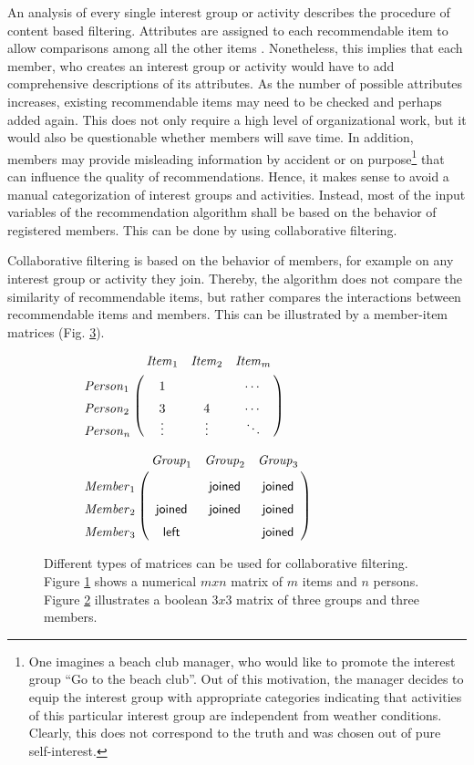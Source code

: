 \documentclass[12pt,numbers=noenddot,parskip,bibliography=totocnumbered,listof=totocnumbered,draft]{scrreprt}
\begin{document}
An analysis of every single interest group or activity describes the procedure of content based filtering. Attributes are assigned to each recommendable item to allow comparisons among all the other items \citep[p.42]{klahold2009}. Nonetheless, this implies that each member, who creates an interest group or activity would have to add comprehensive descriptions of its attributes. As the number of possible attributes increases, existing recommendable items may need to be checked and perhaps added again. This does not only require a high level of organizational work, but it would also be questionable whether members will save time. In addition, members may provide misleading information by accident or on purpose\footnote{One imagines a beach club manager, who would like to promote the interest group ``Go to the beach club''. Out of this motivation, the manager decides to equip the interest group with appropriate categories indicating that activities of this particular interest group are independent from weather conditions. Clearly, this does not correspond to the truth and was chosen out of pure self-interest.} that can influence the quality of recommendations. Hence, it makes sense to avoid a manual categorization of interest groups and activities. Instead, most of the input variables of the recommendation algorithm shall be based on the behavior of registered members.  This can be done by using collaborative filtering.

Collaborative filtering is based on the behavior of members, for example on any interest group or activity they join. \citep[p.62]{klahold2009} Thereby, the algorithm does not compare the similarity of recommendable items, but rather compares the interactions between recommendable items and members. This can be illustrated by a member-item matrices (Fig. \ref{matrix}).

\begin{figure}
\begin{subfigure}[t]{0.5\textwidth}%
\centering
$\bordermatrix{~ & \mathit{Item}_1 & \mathit{Item}_2 & \mathit{Item}_m \cr
\vphantom{\vdots}\mathit{Person}_1 & 1 &  & \cdots  \cr
\vphantom{\vdots}\mathit{Person}_2 & 3 & 4 & \cdots \cr
\vphantom{\vdots}\mathit{Person}_n & \vdotswithin{3} & \vdotswithin{4} & \ddots  }$
\caption{}
\label{nummatrix}
\end{subfigure}%
\begin{subfigure}[t]{0.5\textwidth}%
\centering
$\bordermatrix{~ & \mathit{Group}_1 & \mathit{Group}_2 & \mathit{Group}_3 \cr
\vphantom{\vdots}\mathit{Member}_1 &  & \mathsf{joined} & \mathsf{joined} \cr
\vphantom{\vdots}\mathit{Member}_2 & \mathsf{joined} & \mathsf{joined} & \mathsf{joined} \cr
\vphantom{\vdots}\mathit{Member}_3 & \mathsf{left} &  & \mathsf{joined} }$
\caption{}
\label{boolmatrix}
\end{subfigure}%
\caption[Member-item matrices for collaborative filtering]{Different types of matrices can be used for collaborative filtering. Figure \ref{nummatrix} shows a numerical $mxn$ matrix of $m$ items and $n$ persons. Figure \ref{boolmatrix} illustrates a boolean $3x3$ matrix of three groups and three members.}
\label{matrix}
\end{figure}
\end{document}
